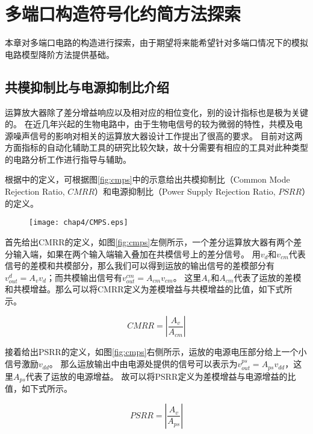 \chapter{多端口构造符号化约简方法探索}
\label{chap:mp}

本章对多端口电路的构造进行探索，由于期望将来能希望针对多端口情况下的模拟电路模型降阶方法提供基础。

\section{共模抑制比与电源抑制比介绍}

运算放大器除了差分增益响应以及相对应的相位变化，别的设计指标也是极为关键的。
在近几年兴起的生物电路中，由于生物电信号的较为微弱的特性，共模及电源噪声信号的影响对相关的运算放大器设计工作提出了很高的要求\parencite{Sawan-CMRR-1999,Abdullah-Biopotential-2015,Paul-22dBPSRR-2012}。
目前对这两方面指标的自动化辅助工具的研究比较欠缺，故十分需要有相应的工具对此种类型的电路分析工作进行指导与辅助。

根据\parencite{GRAY-Analog}中的定义，可根据图\ref{fig:cmps}中的示意给出共模抑制比（Common Mode Rejection Ratio, $CMRR$）和电源抑制比（Power Supply Rejection Ratio, $PSRR$）的定义。

\begin{figure}[!htp]
	\centering
	\texttt{[image: chap4/CMPS.eps]}
\end{figure}

首先给出CMRR的定义，如图\ref{fig:cmps}左侧所示，一个差分运算放大器有两个差分输入端，如果在两个输入端输入叠加在共模信号上的差分信号。
用$v_d$和$v_{cm}$代表信号的差模和共模部分，那么我们可以得到运放的输出信号的差模部分有$v_{out}^{d} = A_v v_d$；而共模输出信号有$v_{out}^{cm} = A_{cm} v_{cm}$。
这里$A_v$和$A_{cm}$代表了运放的差模和共模增益。那么可以将CMRR定义为差模增益与共模增益的比值，如下式所示。

\begin{equation}
CMRR = \left|\frac{A_v}{A_{cm}}\right|
\end{equation}

接着给出PSRR的定义，如图\ref{fig:cmps}右侧所示，运放的电源电压部分给上一个小信号激励$v_{dd}$。
那么运放输出中由电源处提供的信号可以表示为$v_{out}^{ps} = A_{ps}v_{dd}$，这里$A_{ps}$代表了运放的电源增益。
故可以将PSRR定义为差模增益与电源增益的比值，如下式所示。

\begin{equation}
PSRR = \left|\frac{A_v}{A_{ps}}\right|
\end{equation}

